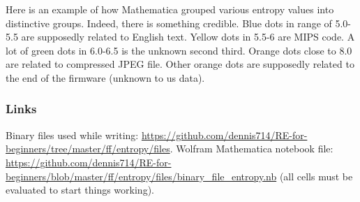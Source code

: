 \begin{figure}[H]
\centering
{}
\end{figure}

Here is an example of how Mathematica grouped various entropy values into distinctive groups.
Indeed, there is something credible. Blue dots in range of 5.0-5.5 are supposedly related to English text.
Yellow dots in 5.5-6 are MIPS code. A lot of green dots in 6.0-6.5 is the unknown second third.
Orange dots close to 8.0 are related to compressed JPEG file.
Other orange dots are supposedly related to the end of the firmware (unknown to us data).

\subsubsection{Links}

Binary files used while writing: \url{https://github.com/dennis714/RE-for-beginners/tree/master/ff/entropy/files}.
Wolfram Mathematica notebook file: \url{https://github.com/dennis714/RE-for-beginners/blob/master/ff/entropy/files/binary_file_entropy.nb}
(all cells must be evaluated to start things working).

